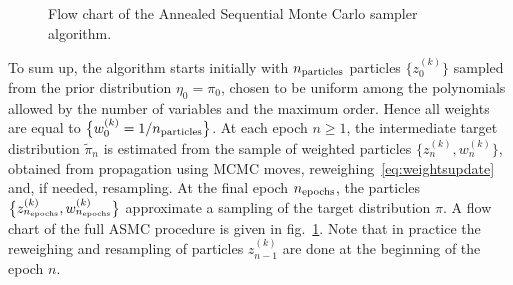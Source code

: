 \documentclass[11pt,a4paper]{article}
\begin{document}
\begin{figure}[h!]
\begin{minipage}{15cm}
\begin{tcolorbox}
				\end{tcolorbox}
			\end{minipage}
			\caption{Flow chart of the Annealed Sequential Monte Carlo sampler algorithm.}
			\label{ASMCflowchart}
		\end{figure}

	To sum up, the algorithm starts initially with $n_{\rm particles}$ particles $\big\{z^{(k)}_{0}\big\}$ sampled from the prior distribution $\eta_{0}=\pi_{0}$, chosen to be uniform among the polynomials allowed by the number of variables and the maximum order. Hence all weights are equal to $\big\{w^{(k)}_{0} = 1/n_{\rm particles}\big\}$. At each epoch $n\geq1$, the intermediate target distribution $\tilde{\pi}_{n}$ is estimated from the sample of weighted particles $\big\{z^{(k)}_{n}, w^{(k)}_{n}\big\}$, obtained from propagation using MCMC moves, reweighing~\eqref{eq:weightsupdate} and, if needed, resampling. At the final epoch $n_{\rm epochs}$, the particles $\big\{z^{(k)}_{n_{\rm epochs}}, w^{(k)}_{n_{\rm epochs}}\big\}$ approximate a sampling of the target distribution $\pi$. A flow chart of the full ASMC procedure is given in fig.~\ref{ASMCflowchart}. Note that in practice the reweighing and resampling of particles $z_{n-1}^{(k)}$ are done at the beginning of the epoch $n$.
\end{document}
